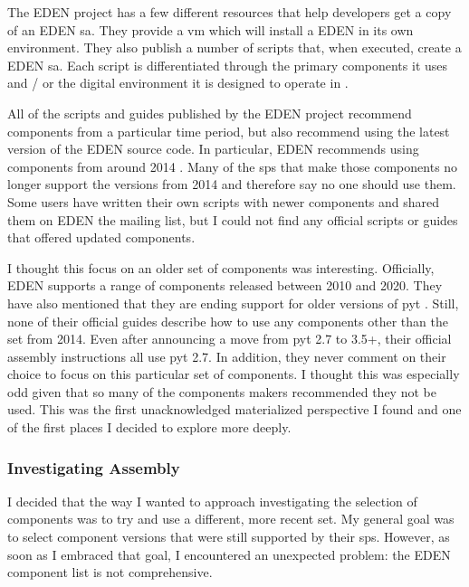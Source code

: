 \documentclass[a4paper,man,natbib,floatsintext]{apa6}
\begin{document}
  The \gls{EDEN} project has a few different resources that help developers get a copy of an \gls{EDEN} \gls{sa}. They provide a \gls{vm} which will install a \gls{EDEN} in its own environment. They also publish a number of scripts that, when executed, create a \gls{EDEN} \gls{sa}. Each script is differentiated through the primary components it uses and / or the digital environment it is designed to operate in \citep{Sahana_Foundation2018-eq}. 

  All of the scripts and guides published by the \gls{EDEN} project recommend components from a particular time period, but also recommend using the latest version of the \gls{EDEN} source code. In particular, \gls{EDEN} recommends using components from around 2014 \citep{Canonical2020-ru,Sahana_Foundation2018-eq}. Many of the \glspl{sp} that make those components no longer support the versions from 2014 and therefore say no one should use them. Some users have written their own scripts with newer components and shared them on \gls{EDEN} the mailing list, but I could not find any official scripts or guides that offered updated components.

  I thought this focus on an older set of components was interesting. Officially, \gls{EDEN} supports a range of components released between 2010 and 2020. They have also mentioned that they are ending support for older versions of \Gls{pyt} \citep{Konig2019-ya}. Still, none of their official guides describe how to use any components other than the set from 2014. Even after announcing a move from \Gls{pyt} 2.7 to 3.5+, their official assembly instructions all use \Gls{pyt} 2.7. In addition, they never comment on their choice to focus on this particular set of components. I thought this was especially odd given that so many of the components makers recommended they not be used. This was the first unacknowledged materialized perspective I found and one of the first places I decided to explore more deeply. 

  \subsubsection{Investigating Assembly}
  I decided that the way I wanted to approach investigating the selection of components was to try and use a different, more recent set. My general goal was to select component versions that were still supported by their \glspl{sp}. However, as soon as I embraced that goal, I encountered an unexpected problem: the \gls{EDEN} component list is not comprehensive.
\end{document}
